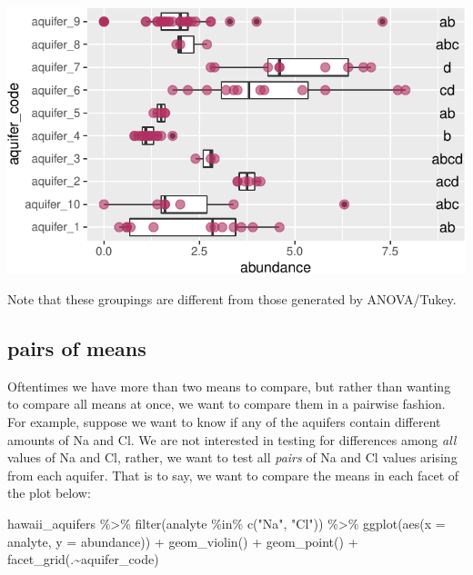 \documentclass[
]{krantz}
\newenvironment{Shaded}{\begin{snugshade}}{\end{snugshade}}
\newcommand{\AttributeTok}[1]{\textcolor[rgb]{0.77,0.63,0.00}{#1}}
\newcommand{\FunctionTok}[1]{\textcolor[rgb]{0.00,0.00,0.00}{#1}}
\newcommand{\NormalTok}[1]{#1}
\newcommand{\SpecialCharTok}[1]{\textcolor[rgb]{0.00,0.00,0.00}{#1}}
\newcommand{\StringTok}[1]{\textcolor[rgb]{0.31,0.60,0.02}{#1}}
\begin{document}
\begin{center}\includegraphics{index_files/figure-latex/unnamed-chunk-152-1} \end{center}

Note that these groupings are different from those generated by ANOVA/Tukey.

\hypertarget{pairs-of-means}{%
\subsection{pairs of means}\label{pairs-of-means}}

Oftentimes we have more than two means to compare, but rather than wanting to compare all means at once, we want to compare them in a pairwise fashion. For example, suppose we want to know if any of the aquifers contain different amounts of Na and Cl. We are not interested in testing for differences among \emph{all} values of Na and Cl, rather, we want to test all \emph{pairs} of Na and Cl values arising from each aquifer. That is to say, we want to compare the means in each facet of the plot below:

\begin{Shaded}
\begin{Highlighting}[]
\NormalTok{hawaii\_aquifers }\SpecialCharTok{\%\textgreater{}\%}
  \FunctionTok{filter}\NormalTok{(analyte }\SpecialCharTok{\%in\%} \FunctionTok{c}\NormalTok{(}\StringTok{"Na"}\NormalTok{, }\StringTok{"Cl"}\NormalTok{)) }\SpecialCharTok{\%\textgreater{}\%}
  \FunctionTok{ggplot}\NormalTok{(}\FunctionTok{aes}\NormalTok{(}\AttributeTok{x =}\NormalTok{ analyte, }\AttributeTok{y =}\NormalTok{ abundance)) }\SpecialCharTok{+} \FunctionTok{geom\_violin}\NormalTok{() }\SpecialCharTok{+} \FunctionTok{geom\_point}\NormalTok{() }\SpecialCharTok{+} \FunctionTok{facet\_grid}\NormalTok{(.}\SpecialCharTok{\textasciitilde{}}\NormalTok{aquifer\_code)}
\end{Highlighting}
\end{Shaded}
\end{document}
